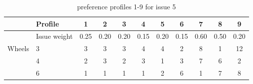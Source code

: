 \documentclass[11pt,a4paper]{report}
\begin{document}
\begin{table}[H]
\centering
\caption{preference profiles 1-9 for issue 5}
\label{tab:issue5}
\begin{tabular}{|p{3cm}|p{3cm}||c|c|c||c|c|c||c|c|c|}
\hline
&Profile & 1 & 2 & 3 & 4 & 5 & 6 & 7 & 8 & 9 \\
\hline
&Issue weight& 0.25 & 0.20 & 0.20 & 0.15 & 0.20 & 0.15 & 0.60 & 0.50 & 0.20 \\
\hline
\hline
Wheels &3   & 3 & 3 &3 &4 &4 &2 &8 &1 &12 \\
       &4   & 2 & 3 &2 &3 &1 &3 &7 &6 &2 \\
       &6   & 1 & 1 &1 &1 &2 &6 &1 &7 &8 \\
\hline
\end{tabular}
\end{table}
\end{document}
